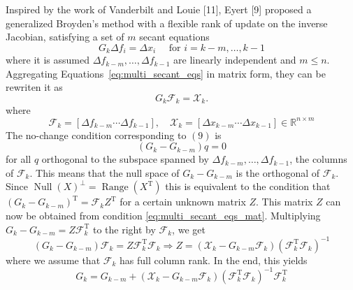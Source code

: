 Inspired by the work of Vanderbilt and Louie [11], Eyert [9] proposed a generalized Broyden's method with a flexible rank of update on the inverse Jacobian, satisfying a set of \(m\) secant equations
\begin{equation} \label{eq:multi_secant_eqs}
  G_{k} \Delta f_{i}=\Delta x_{i} \quad \text { for } i=k-m, \ldots, k-1
\end{equation}
where it is assumed \(\Delta f_{k-m}, \ldots, \Delta f_{k-1}\) are linearly independent and \(m \leqslant n\). 
Aggregating Equations~\eqref{eq:multi_secant_eqs} in matrix form, they can be rewriten it as
\begin{equation} \label{eq:multi_secant_eqs_mat}
  G_{k} \mathscr{F}_{k}=\mathscr{X}_{k}.
\end{equation}
where
\begin{equation}
\mathscr{F}_{k}=\left[\Delta f_{k-m} \cdots \Delta f_{k-1}\right], \quad \mathscr{X}_{k}=\left[\Delta x_{k-m} \cdots \Delta x_{k-1}\right] \in \mathbb{R}^{n \times m}
\end{equation}
The no-change condition corresponding to \((9)\) is
\begin{equation}
  \left(G_{k}-G_{k-m}\right) q=0
\end{equation}
for all \(q\) orthogonal to the subspace spanned by \(\Delta f_{k-m}, \ldots, \Delta f_{k-1}\), the columns of \(\mathscr{F}_{k}\). 
This means that the null space of \(G_{k}-G_{k-m}\) is the orthogonal of \(\mathscr{F}_{k}\). 
Since \(\operatorname{Null}(X)^{\perp}=\operatorname{Range}\left(X^{\mathrm{T}}\right)\) this is equivalent to the condition that \(\left(G_{k}-G_{k-m}\right)^{\mathrm{T}}=\mathscr{F}_{k} Z^{\mathrm{T}}\) for a certain unknown matrix \(Z\).
 This matrix \(Z\) can now be obtained from condition \eqref{eq:multi_secant_eqs_mat}. Multiplying \(G_{k}-G_{k-m}=Z \mathscr{F}_{k}^{\mathrm{T}}\) to the right by \(\mathscr{F}_{k}\), we get
\begin{equation}
  \left(G_{k}-G_{k-m}\right) \mathscr{F}_{k}=Z \mathscr{F}_{k}^{\mathrm{T}} \mathscr{F}_{k} \Rightarrow Z=\left(\mathscr{X}_{k}-G_{k-m} \mathscr{F}_{k}\right)\left(\mathscr{F}_{k}^{\mathrm{T}} \mathscr{F}_{k}\right)^{-1}
\end{equation}
where we assume that \(\mathscr{F}_{k}\) has full column rank. 
In the end, this yields
\begin{equation}
  G_{k}=G_{k-m}+\left(\mathscr{X}_{k}-G_{k-m} \mathscr{F}_{k}\right)\left(\mathscr{F}_{k}^{\mathrm{T}} \mathscr{F}_{k}\right)^{-1} \mathscr{F}_{k}^{\mathrm{T}}
\end{equation}
